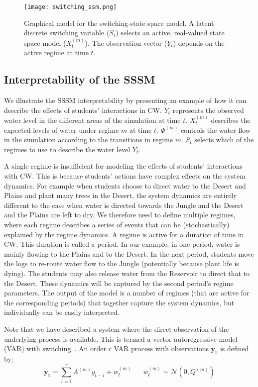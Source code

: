 \begin{figure}
  \centering
  \texttt{[image: switching\_ssm.png]}
  \caption{Graphical model for the switching-state space model. A latent discrete switching variable ($S_t$) selects an active, real-valued state space model ($X^{(m)}_t$). The observation vector ($Y_t$)  depends on the active regime at time $t$.}
  \label{fig:switching_ssm}
\end{figure}

\subsection{Interpretability of the SSSM}\label{sec:interpretability_of_ssm}
We illustrate the SSSM interpretability by presenting an example of how it can describe the effects of students' interactions in CW. $Y_t$ represents the observed water level in the different areas of the simulation at time $t$. $X_t^{(m)}$ describes the expected levels of water under regime $m$ at time $t$. $\Phi^{(m)}$ controls the water flow in the simulation according to the transitions in regime $m$. $S_t$ selects which of the regimes to use to describe the water level $Y_t$.

A single regime is insufficient for modeling the effects of students' interactions with CW. This is because students' actions have complex effects on the system dynamics. For example when students choose to direct water to the Desert and Plains and plant many trees in the Desert, the system dynamics are entirely different to the case when water is directed towards the Jungle and the Desert and the Plains are left to dry. We therefore need to define multiple regimes, where each regime describes a series of events that can be (stochastically) explained by the regime dynamics. A regime is active for a duration of time in CW. This duration is called a period. In our example, in one period, water is mainly flowing to the Plains and to the Desert. In the next period, students move the logs to re-route water flow to the Jungle (potentially because plant life is dying). The students may also release water from the Reservoir to direct that to the Desert. These dynamics will be captured by the second period's regime parameters. The output of the model is a number of regimes (that are active for the corresponding periods) that together capture the system dynamics, but individually can be easily interpreted.

Note that we have described a system where the direct observation of the underlying process is available. This is termed a vector autoregressive model (VAR) with switching~\citep{fox2009nonparametric, shumway2000time,kim1994dynamic}. An order $r$ VAR process with observations $\mathbf{y_t}$ is defined by:
\begin{equation}\label{eq:var}
  \mathbf{y_t} = \sum\limits_{i=1}^{r} A^{(m)}y_{t-i} + w^{(m)}_t \hspace{20pt} w^{(m)}_t \sim \mathcal{N}(0, Q^{(m)})
\end{equation}

